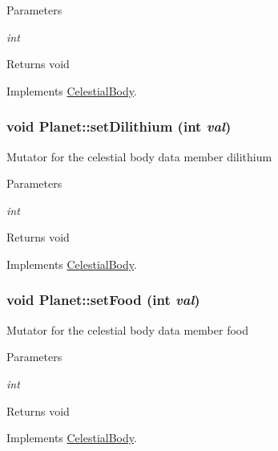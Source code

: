\begin{DoxyParams}{Parameters}
\item[{\em int}]\end{DoxyParams}
\begin{DoxyReturn}{Returns}
void 
\end{DoxyReturn}


Implements \hyperlink{classCelestialBody}{CelestialBody}.

\hypertarget{classPlanet_a780868e3c6275c2f8026bf7f7b910be1}{
\subsubsection[{setDilithium}]{\setlength{\rightskip}{0pt plus 5cm}void Planet::setDilithium (int {\em val})}}
\label{d5/dec/classPlanet_a780868e3c6275c2f8026bf7f7b910be1}
Mutator for the celestial body data member dilithium


\begin{DoxyParams}{Parameters}
\item[{\em int}]\end{DoxyParams}
\begin{DoxyReturn}{Returns}
void 
\end{DoxyReturn}


Implements \hyperlink{classCelestialBody}{CelestialBody}.

\hypertarget{classPlanet_a2f73c4ce9e4e4eb204b50413ea81d0cc}{
\subsubsection[{setFood}]{\setlength{\rightskip}{0pt plus 5cm}void Planet::setFood (int {\em val})}}
\label{d5/dec/classPlanet_a2f73c4ce9e4e4eb204b50413ea81d0cc}
Mutator for the celestial body data member food


\begin{DoxyParams}{Parameters}
\item[{\em int}]\end{DoxyParams}
\begin{DoxyReturn}{Returns}
void 
\end{DoxyReturn}


Implements \hyperlink{classCelestialBody}{CelestialBody}.

